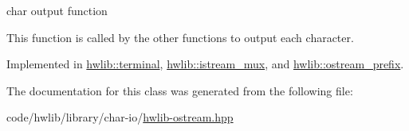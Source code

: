 char output function

This function is called by the other functions to output each character. 

Implemented in \hyperlink{classhwlib_1_1terminal_abce5e677f5eb98ecf53f9d8b617fb206}{hwlib\+::terminal}, \hyperlink{classhwlib_1_1istream__mux_a34deb0a6755b04923c4c8206452af37b}{hwlib\+::istream\+\_\+mux}, and \hyperlink{classhwlib_1_1ostream__prefix_a9a3bc3759d39b0d93202ff4aaacda270}{hwlib\+::ostream\+\_\+prefix}.



The documentation for this class was generated from the following file\+:\begin{DoxyCompactItemize}
\item 
code/hwlib/library/char-\/io/\hyperlink{hwlib-ostream_8hpp}{hwlib-\/ostream.\+hpp}\end{DoxyCompactItemize}
